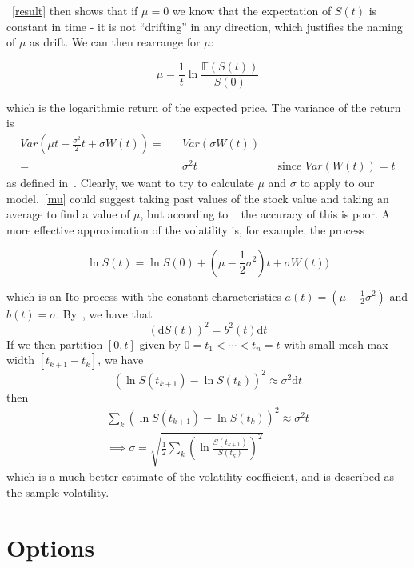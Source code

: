 \documentclass[11pt]{article} %
\begin{document}
~\eqref{result} then shows that if $\mu = 0$ we know that the expectation of $S(t)$ is 
constant in time - it is not ``drifting'' in any direction, which justifies the 
naming of $\mu$ as drift. We can then rearrange for $\mu$:

\begin{equation} \label{mu}
    \mu = \frac{1}{t}\ln{\frac{\mathbb{E}(S(t))}{S(0)}}
\end{equation}

which is the logarithmic return of the expected price.
The variance of the return is 
\begin{align}
    Var(\mu t - \frac{\sigma^2}{2}t + \sigma W(t)) = && Var(\sigma W(t)) \\
    = && \sigma^2t  && \text{since $Var(W(t)) = t$}
\end{align}
as defined in~\cite{blackscholes}. Clearly, we want to try to calculate $\mu$ and 
$\sigma$ to apply to our model.~\eqref{mu} could suggest taking past values of the 
stock value and taking an average to find a value of $\mu$, but according to 
~\cite{blackscholes} the accuracy of this is poor. 
A more effective approximation of the volatility is, for example, the process 

\begin{equation}
    \ln{S(t)} = \ln{S(0)} + (\mu - \frac{1}{2}\sigma^2)t + \sigma W(t))
\end{equation}

which is an Ito process with the constant characteristics $a(t) = (\mu - \frac{1}{2}\sigma^2)$
 and $b(t) = \sigma$. By~\cite{quadtraticvariation}, we have that
 \begin{equation}
     {(\mathrm{d}S(t))}^2 = b^2(t) \mathrm{d}t
 \end{equation}
 If we then partition $[0,t]$ given by $0 = t_1 < \cdots < t_n = t$ with small mesh max 
 width $[t_{k+1} - t_k]$, we have 
 \begin{equation}
     {(\ln{S(t_{k+1}) - \ln{S(t_k)}})}^2 \approx \sigma^2 \mathrm{d}t
 \end{equation}
then 
\begin{align}
    \sum_k {(\ln{S(t_{k+1}) - \ln{S(t_k)}})}^2 \approx \sigma^2 t\\
    \implies
    \sigma = \sqrt{\frac{1}{2}\sum_k {(\ln{\frac{S(t_{k+1})}{S(t_k)}})}^2}
    \label{volatilityapprox}
\end{align}
which is a much better estimate of the volatility coefficient, and is described as the 
sample volatility.
\section{Options}
\end{document}
